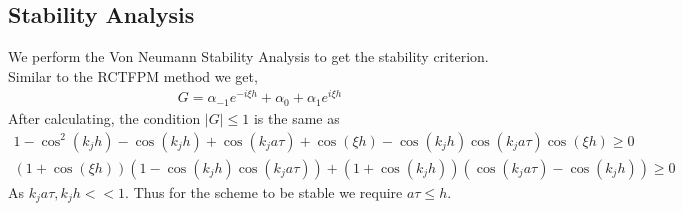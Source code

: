 \subsection{Stability Analysis}
We perform the Von Neumann Stability Analysis to get the stability criterion.
Similar to the RCTFPM method we get,
\begin{align*}
 G = \alpha_{-1}e^{-i \xi h} + \alpha_{0} + \alpha_{1}e^{i \xi h}
\end{align*}
After calculating, the condition $|G| \leq 1$ is the same as
\begin{align*}
 1-\cos^2(k_{j}h)-\cos(k_{j}h) + \cos(k_{j} a \tau) + \cos(\xi h) - \cos(k_{j} h)\cos(k_{j} a \tau ) \cos(\xi h) \geq 0 \\
 (1+\cos(\xi h))(1-\cos(k_{j} h) \cos(k_{j} a \tau)) + (1+ \cos(k_{j} h))(\cos(k_{j} a \tau) - \cos(k_{j} h)) \geq 0
\end{align*}
As $k_{j} a \tau, k_{j} h << 1$.
Thus for the scheme to be stable we require $a \tau \leq h$.\\

